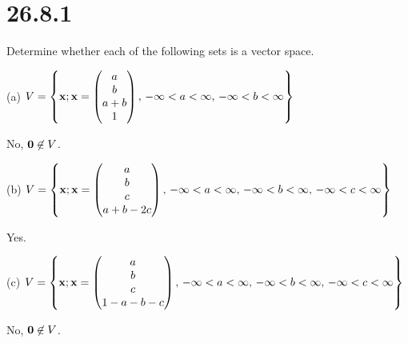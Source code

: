 \section*{26.8.1}
Determine whether each of the following sets is a vector space.

\bigskip
\noindent
(a) $\displaystyle{
V=\left\{
{\bf x}; {\bf x}=\left(\begin{matrix}
a\cr
b\cr
a+b\cr
1
\end{matrix}\right),\,
-\infty<a<\infty,\,
-\infty<b<\infty
\right\}}$

\bigskip
\noindent
No, ${\bf 0}\not\in V$.

\bigskip
\noindent
(b) $\displaystyle{
V=\left\{
{\bf x}; {\bf x}=\left(\begin{matrix}
a\cr
b\cr
c\cr
a+b-2c
\end{matrix}\right),\,
-\infty<a<\infty,\,
-\infty<b<\infty,\,
-\infty<c<\infty
\right\}}$

\bigskip
\noindent
Yes.

\bigskip
\noindent
(c) $\displaystyle{
V=\left\{
{\bf x}; {\bf x}=\left(\begin{matrix}
a\cr
b\cr
c\cr
1-a-b-c
\end{matrix}\right),\,
-\infty<a<\infty,\,
-\infty<b<\infty,\,
-\infty<c<\infty
\right\}}$

\bigskip
\noindent
No, ${\bf 0}\not\in V$.
